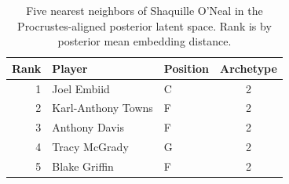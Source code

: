 \begin{table}[htbp]
  \centering\small
  \begin{tabular}{rllc}
    \toprule
    Rank & Player & Position & Archetype \\
    \midrule
    1 & Joel Embiid & C & 2 \\
    2 & Karl-Anthony Towns & F & 2 \\
    3 & Anthony Davis & F & 2 \\
    4 & Tracy McGrady & G & 2 \\
    5 & Blake Griffin & F & 2 \\
    \bottomrule
  \end{tabular}
  \caption{Five nearest neighbors of Shaquille O'Neal in the Procrustes-aligned posterior latent space. Rank is by posterior mean embedding distance.}
\end{table}

